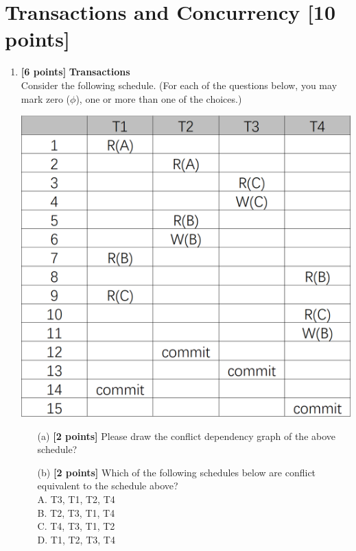 \documentclass[10pt]{article}
\begin{document}
\newpage
\section{Transactions and Concurrency \textbf{[10 points]}}

\begin{enumerate}

	\item \textbf{[6 points]} \textbf{Transactions} \\
	      Consider the following schedule. (For each of the questions below, you may mark zero ($\phi$), one
	      or more than one of the choices.)
	      \begin{center}
		      \includegraphics[scale=0.35]{transaction}
	      \end{center}
	      \begin{itemize}
		      \item[(a)] \textbf{[2 points]} Please draw the conflict dependency graph of the above schedule?\\

		      \item[(b)] \textbf{[2 points]} Which of the following schedules below are conflict equivalent to the schedule above?\\
		            A. T3, T1, T2, T4\\
		            B. T2, T3, T1, T4\\
		            C. T4, T3, T1, T2\\
		            D. T1, T2, T3, T4 \\


\end{itemize}
\end{enumerate}
\end{document}
